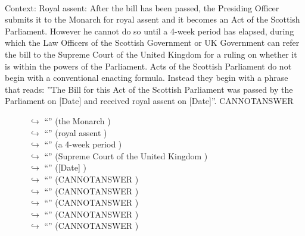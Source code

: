 \documentclass[11pt,a4paper, onecolumn]{article}
\begin{document}
\\ Context: Royal assent: After the bill has been passed, the Presiding Officer submits it to the Monarch for royal assent and it becomes an Act of the Scottish Parliament. However he cannot do so until a 4-week period has elapsed, during which the Law Officers of the Scottish Government or UK Government can refer the bill to the Supreme Court of the United Kingdom for a ruling on whether it is within the powers of the Parliament. Acts of the Scottish Parliament do not begin with a conventional enacting formula. Instead they begin with a phrase that reads: ''The Bill for this Act of the Scottish Parliament was passed by the Parliament on [Date] and received royal assent on [Date]''. CANNOTANSWER

\begin{figure}[t] \small \begin{tcolorbox}[boxsep=0pt,left=5pt,right=0pt,top=2pt,colback = yellow!5] \begin{dialogue}
 \small 
\colorbox{pink!25}{$\hookrightarrow$}
{ ``'' (the Monarch ) }
\\
\colorbox{pink!25}{$\hookrightarrow$}
{ ``'' (royal assent ) }
\\
\colorbox{pink!25}{$\hookrightarrow$}
{ ``'' (a 4-week period ) }
\\
\colorbox{pink!25}{$\hookrightarrow$}
{ ``'' (Supreme Court of the United Kingdom ) }
\\
\colorbox{pink!25}{$\hookrightarrow$}
{ ``'' ([Date] ) }
\\
\colorbox{pink!25}{$\hookrightarrow$}
{ ``'' (CANNOTANSWER ) }
\\
\colorbox{pink!25}{$\hookrightarrow$}
{ ``'' (CANNOTANSWER ) }
\\
\colorbox{pink!25}{$\hookrightarrow$}
{ ``'' (CANNOTANSWER ) }
\\
\colorbox{pink!25}{$\hookrightarrow$}
{ ``'' (CANNOTANSWER ) }
\\
\colorbox{pink!25}{$\hookrightarrow$}
{ ``'' (CANNOTANSWER ) }
\\
 \end{dialogue}\end{tcolorbox}\end{figure}
\end{document}
